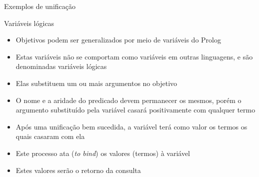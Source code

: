 \begin{frame}[fragile]{Exemplos de unificação}


\end{frame}

\begin{frame}[fragile]{Variáveis lógicas}

    \begin{itemize}
        \item Objetivos podem ser generalizados por meio de variáveis do Prolog

        \item Estas variáveis não se comportam como variáveis em outras linguagens, e são 
            denominadas variáveis lógicas

        \item Elas substituem um ou mais argumentos no objetivo

        \item O nome e a aridade do predicado devem permanecer os mesmos, porém o argumento 
            substituído pela variável casará positivamente com qualquer termo

        \item Após uma unificação bem sucedida, a variável terá como valor os termos os quais 
            casaram com ela

        \item Este processo ata (\textit{to bind}) os valores (termos) à variável

        \item Estes valores serão o retorno da consulta

    \end{itemize}

\end{frame}

